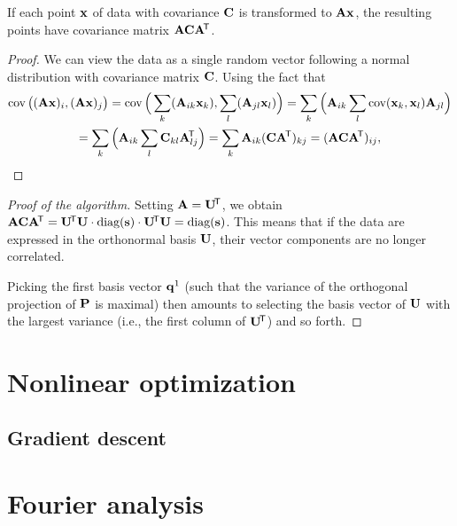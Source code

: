 \begin{lemma}
If each point $\mathbf{x}$ of data with covariance $\mathbf{C}$ is transformed to $\mathbf{A} \mathbf{x}$, the resulting points have covariance matrix $\mathbf{A} \mathbf{C} \mathbf{A} ^{\!\mathsf{T}}$.
\end{lemma}

\begin{proof}
We can view the data as a single random vector following a normal distribution with covariance matrix $\mathbf{C}$.
Using the fact that 
\begin{multline}
\operatorname{\textrm{cov}}\big( (\mathbf{A} \mathbf{x})_i, (\mathbf{A} \mathbf{x})_j \big) = \operatorname{\textrm{cov}}\Big( \sum_k(\mathbf{A}_{ik} \mathbf{x}_k), \sum_l(\mathbf{A}_{jl} \mathbf{x}_l) \Big) = \sum_k \Big( \mathbf{A}_{ik} \sum_l \operatorname{\textrm{cov}}( \mathbf{x}_k, \mathbf{x}_l ) \mathbf{A}_{jl} \Big) \\
= \sum_k \Big( \mathbf{A}_{ik} \sum_l \mathbf{C}_{kl} \mathbf{A}_{lj}^{\!\mathsf{T}} \Big) = \sum_k \mathbf{A}_{ik} (\mathbf{C} \mathbf{A} ^{\!\mathsf{T}})_{kj} = (\mathbf{A} \mathbf{C} \mathbf{A}^{\!\mathsf{T}})_{ij},
\end{multline}
\end{proof}

\begin{proof}[Proof of the algorithm]
Setting $\mathbf{A} = \mathbf{U}^{\!\mathsf{T}}$, we obtain $\mathbf{A} \mathbf{C} \mathbf{A} ^{\!\mathsf{T}} = \mathbf{U}^{\!\mathsf{T}} \mathbf{U} \cdot \textrm{diag}(\mathbf{s}) \cdot \mathbf{U}^{\!\mathsf{T}} \mathbf{U} = \textrm{diag}(\mathbf{s})$.
This means that if the data are expressed in the orthonormal basis  $\mathbf{U}$, their vector components are no longer correlated.

Picking the first basis vector $\mathbf{q}^1$ (such that the variance of the orthogonal projection of $\mathbf{P}$ is maximal) then amounts to selecting the basis vector of $\mathbf{U}$ with the largest variance (i.e., the first column of $\mathbf{U} ^{\!\mathsf{T}}$) and so forth.

\end{proof}

\section{Nonlinear optimization}

\subsection{Gradient descent}


\section{Fourier analysis}

